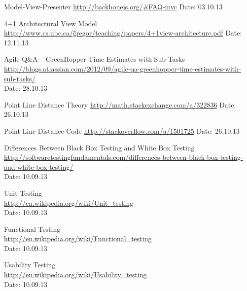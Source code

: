 \begin{thebibliography}{99}
	Model-View-Presenter\newline
	\href {http://backbonejs.org/\#FAQ-mvc}{http://backbonejs.org/\#FAQ-mvc}\newline
	Date: 03.10.13

	4+1 Architectural View Model
	\href{http://www.cs.ubc.ca/~gregor/teaching/papers/4+1view-architecture.pdf}{http://www.cs.ubc.ca/\~gregor/teaching/papers/4+1view-architecture.pdf}
	Date: 12.11.13

	Agile Q\&A – GreenHopper Time Estimates with Sub-Tasks \\
	\href{http://blogs.atlassian.com/2012/09/agile-qa-greenhopper-time-estimates-with-sub-tasks/}{http://blogs.atlassian.com/2012/09/agile-qa-greenhopper-time-estimates-with-sub-tasks/} \\
	Date: 28.10.13

	Point Line Distance Theory\newline
	\href {http://math.stackexchange.com/a/322836}{http://math.stackexchange.com/a/322836}\newline
	Date: 26.10.13

	Point Line Distance Code\newline
	\href {http://stackoverflow.com/a/1501725}{http://stackoverflow.com/a/1501725}\newline
	Date: 26.10.13

	Differences Between Black Box Testing and White Box Testing \\
	\href {http://softwaretestingfundamentals.com/differences-between-black-box-testing-and-white-box-testing/}{http://softwaretestingfundamentals.com/differences-between-black-box-testing-and-white-box-testing/} \\
	Date: 10.09.13

	Unit Testing \\
	\href {http://en.wikipedia.org/wiki/Unit_testing}{http://en.wikipedia.org/wiki/Unit\_testing} \\
	Date: 10.09.13

	Functional Testing \\
	\href {http://en.wikipedia.org/wiki/Functional_testing}{http://en.wikipedia.org/wiki/Functional\_testing} \\
	Date: 10.09.13

	Usability Testing \\
	\href {http://en.wikipedia.org/wiki/Usability_testing}{http://en.wikipedia.org/wiki/Usability\_testing} \\
	Date: 10.09.13


\end{thebibliography}
